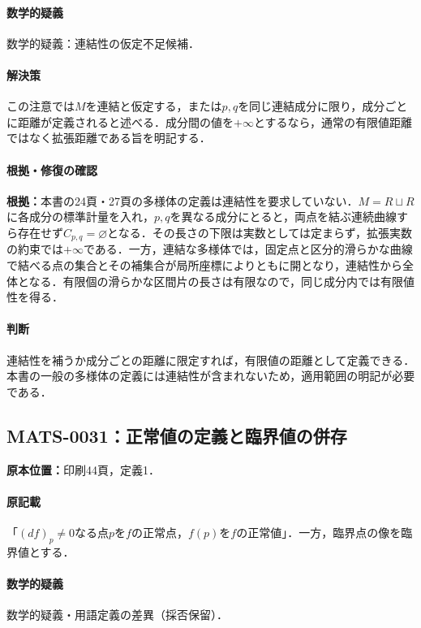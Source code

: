 \documentclass[a4paper,10pt]{ltjsarticle}
\begin{document}
\paragraph{数学的疑義}数学的疑義：連結性の仮定不足候補．

\paragraph{解決策}この注意では$M$を連結と仮定する，または$p,q$を同じ連結成分に限り，成分ごとに距離が定義されると述べる．成分間の値を$+\infty$とするなら，通常の有限値距離ではなく拡張距離である旨を明記する．

\paragraph{根拠・修復の確認}\textbf{根拠：}本書の24頁・27頁の多様体の定義は連結性を要求していない．$M=R\sqcup R$に各成分の標準計量を入れ，$p,q$を異なる成分にとると，両点を結ぶ連続曲線すら存在せず$C_{p,q}=\varnothing$となる．その長さの下限は実数としては定まらず，拡張実数の約束では$+\infty$である．一方，連結な多様体では，固定点と区分的滑らかな曲線で結べる点の集合とその補集合が局所座標によりともに開となり，連結性から全体となる．有限個の滑らかな区間片の長さは有限なので，同じ成分内では有限値性を得る．

\paragraph{判断}連結性を補うか成分ごとの距離に限定すれば，有限値の距離として定義できる．本書の一般の多様体の定義には連結性が含まれないため，適用範囲の明記が必要である．


\subsection*{MATS-0031：正常値の定義と臨界値の併存}\label{math:MATS-0031}
\noindent\textbf{原本位置：}印刷44頁，定義1．

\paragraph{原記載}「$(df)_p\ne0$なる点$p$を$f$の正常点，$f(p)$を$f$の正常値」．一方，臨界点の像を臨界値とする．

\paragraph{数学的疑義}数学的疑義・用語定義の差異（採否保留）．
\end{document}
